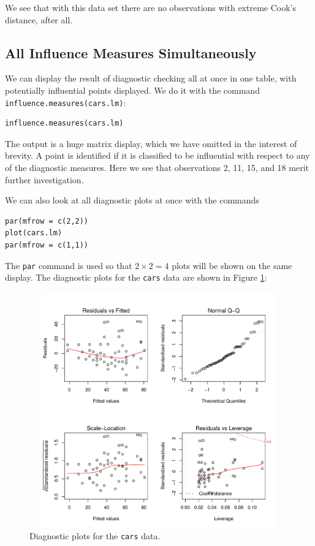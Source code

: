 \documentclass[captions=tableheading]{scrbook}
\begin{document}
We see that with this data set there are no observations with extreme Cook's distance, after all.
\subsection{All Influence Measures Simultaneously}
\label{sec-11-5-5}


We can display the result of diagnostic checking all at once in one table, with potentially influential points displayed. We do it with the command \texttt{influence.measures(cars.lm)}:


\begin{verbatim}
influence.measures(cars.lm)
\end{verbatim}

The output is a huge matrix display, which we have omitted in the interest of brevity. A point is identified if it is classified to be influential with respect to any of the diagnostic measures. Here we see that observations 2, 11, 15, and 18 merit further investigation.  

We can also look at all diagnostic plots at once with the commands


\begin{verbatim}
par(mfrow = c(2,2))
plot(cars.lm)
par(mfrow = c(1,1))
\end{verbatim}

The \texttt{par} command is used so that \(2\times 2 = 4\) plots will be shown on the same display. The diagnostic plots for the \texttt{cars} data are shown in Figure \ref{fig:Diagnostic-plots-cars}:

\begin{figure}[th]
  \includegraphics[width=5in, height=4in]{img/Diagnostic-plots-cars.pdf}
  \caption[Diagnostic plots for the \texttt{cars} data]{\small Diagnostic plots for the \texttt{cars} data.}
  \label{fig:Diagnostic-plots-cars}
\end{figure}
\end{document}
